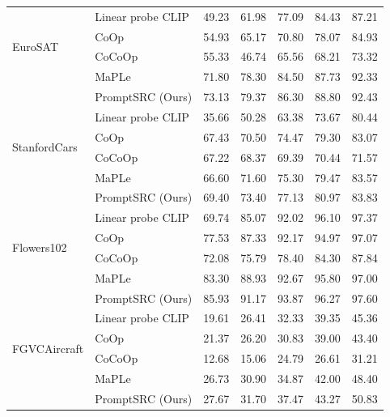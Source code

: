 \begin{table}[t!]
{\begin{tabular}{ll|ccccc}
                               \midrule
\multirow{4}{*}{EuroSAT}       & Linear probe CLIP       &49.23	&61.98	&77.09&	84.43	&87.21\\
                               & CoOp                   &54.93	&65.17	&70.80	&78.07	&84.93\\
                               & CoCoOp                  & 55.33	&46.74	&65.56&	68.21	&73.32\\
                                                              & MaPLe                  & 71.80	&78.30	&84.50&	87.73&	92.33\\
                              \rowcolor{tabhighlight}   & PromptSRC (Ours)             &73.13 &79.37	&86.30	&88.80	&92.43\\
\midrule
\multirow{4}{*}{StanfordCars}  & Linear probe CLIP     & 35.66	&50.28	&63.38	&73.67	&80.44\\
                           & CoOp                        &67.43	&70.50	&74.47	&79.30	&83.07\\
                                   & CoCoOp              & 67.22	&68.37	&69.39	&70.44&	71.57\\
                                                                  & MaPLe                  & 66.60	&71.60	&75.30&	79.47&	83.57\\
                              \rowcolor{tabhighlight}  &  PromptSRC (Ours)              &69.40	&73.40	&77.13	&80.97	&83.83\\
\midrule
\multirow{4}{*}{Flowers102}    & Linear probe CLIP      & 69.74	&85.07	&92.02	&96.10	&97.37\\
                               & CoOp                   & 77.53	&87.33	&92.17	&94.97	&97.07\\
                               & CoCoOp                    &72.08	&75.79	&78.40	&84.30	&87.84\\
                                                              & MaPLe                  & 83.30	&88.93	&92.67&	95.80&	97.00\\
                                \rowcolor{tabhighlight}  & PromptSRC (Ours)           & 85.93	&91.17	&93.87	&96.27	&97.60\\
                               \midrule
\multirow{4}{*}{FGVCAircraft}  & Linear probe CLIP       & 19.61	&26.41	&32.33	&39.35&	45.36\\
                               & CoOp                     & 21.37&	26.20	&30.83	&39.00	&43.40\\
                               & CoCoOp                   & 12.68	&15.06	&24.79	&26.61	&31.21\\
                                                              & MaPLe                  & 26.73	&30.90	& 34.87&	42.00&	48.40\\
                              \rowcolor{tabhighlight}   & PromptSRC (Ours)          & 27.67	&31.70	&37.47&	43.27	&50.83\\


\end{tabular}}
\end{table}

